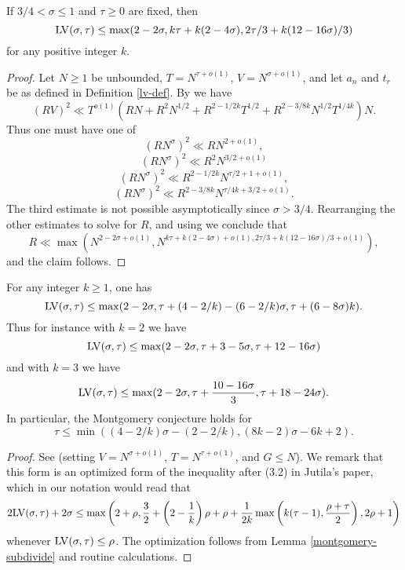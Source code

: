 \begin{lemma}\label{hb-lvt-2} If $3/4 < \sigma \leq 1$ and $\tau \geq 0$ are fixed, then
    $$ \mathrm{LV}(\sigma,\tau) \leq \max( 2-2\sigma, k\tau + k(2-4\sigma), 2\tau/3 + k(12-16\sigma)/3 )$$
    for any positive integer $k$.
    \end{lemma}

\begin{proof}
    Let $N \geq 1$ be unbounded, $T = N^{\tau + o(1)}$, $V = N^{\sigma + o(1)}$, and let $a_n$ and $t_r$ be as defined in Definition \ref{lv-def}. By \cite[Lemma~6]{heathbrown_large_1979} we have
    $$ (R V)^2 \ll T^{o(1)}( RN + R^2 N^{1/2} + R^{2-1/2k} T^{1/2} + R^{2-3/8k} N^{1/2} T^{1/4k}) N.$$
    Thus one must have one of
$$ (R N^\sigma)^2 \ll RN^{2+o(1)},$$
$$ (R N^\sigma)^2 \ll R^2 N^{3/2+o(1)}$$
$$ (R N^\sigma)^2 \ll R^{2-1/2k} N^{\tau/2+1+o(1)},$$
$$ (R N^\sigma)^2 \ll R^{2-3/8k} N^{\tau/4k + 3/2+ o(1)}.$$
The third estimate is not possible asymptotically since $\sigma > 3/4$.  Rearranging the other estimates to solve for $R$, and using we conclude that
$$ R \ll \max\left( N^{2-2\sigma+o(1)}, N^{k\tau + k(2-4\sigma)+o(1), 2\tau/3 + k(12-16\sigma)/3 + o(1)}\right),$$
and the claim follows.
\end{proof}

\begin{theorem}\label{jutila-lvt}  For any integer $k \geq 1$, one has
$$ \mathrm{LV}(\sigma,\tau) \leq \max(2-2\sigma, \tau + (4-2/k) - (6-2/k)\sigma, \tau + (6-8\sigma)k).$$
Thus for instance with $k=2$ we have
$$ \mathrm{LV}(\sigma,\tau) \leq \max(2-2\sigma, \tau + 3 - 5\sigma, \tau + 12-16\sigma)$$
and with $k=3$ we have
$$ \mathrm{LV}(\sigma,\tau) \leq \max(2-2\sigma, \tau + \frac{10-16\sigma}{3}, \tau + 18-24\sigma).$$
In particular, the Montgomery conjecture holds for
$$ \tau \leq \min( (4-2/k)\sigma - (2-2/k), (8k-2)\sigma - 6k + 2).$$
\end{theorem}

\begin{proof} See \cite[(1.4)]{jutila_zero_density_1977} (setting $V = N^{\sigma+o(1)}$, $T = N^{\tau+o(1)}$, and $G \leq N$).  We remark that this form is an optimized form of the inequality after (3.2) in Jutila's paper, which in our notation would read that
$$ 2\mathrm{LV}(\sigma,\tau) + 2\sigma \leq \max \left(2 + \rho, \frac{3}{2} + \left(2 - \frac{1}{k}\right)\rho + \rho + \frac{1}{2k}\max\left(k(\tau-1), \frac{\rho+\tau}{2}\right), 2\rho + 1\right)$$
whenever $\mathrm{LV}(\sigma,\tau) \leq \rho$.  The optimization follows from Lemma \ref{montgomery-subdivide} and routine calculations.
\end{proof}


